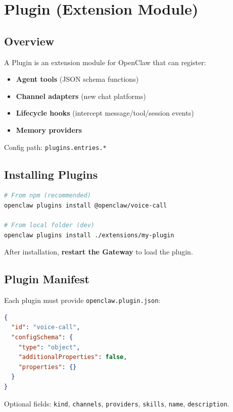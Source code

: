 \chapter{Plugin (Extension Module)}

\section{Overview}

A Plugin is an extension module for OpenClaw that can register:

\begin{itemize}
  \item \textbf{Agent tools} (JSON schema functions)
  \item \textbf{Channel adapters} (new chat platforms)
  \item \textbf{Lifecycle hooks} (intercept message/tool/session events)
  \item \textbf{Memory providers}
\end{itemize}

Config path: \texttt{plugins.entries.*}

\section{Installing Plugins}

\begin{lstlisting}[language=bash]
# From npm (recommended)
openclaw plugins install @openclaw/voice-call

# From local folder (dev)
openclaw plugins install ./extensions/my-plugin
\end{lstlisting}

After installation, \textbf{restart the Gateway} to load the plugin.

\section{Plugin Manifest}

Each plugin must provide \texttt{openclaw.plugin.json}:

\begin{lstlisting}[language=json]
{
  "id": "voice-call",
  "configSchema": {
    "type": "object",
    "additionalProperties": false,
    "properties": {}
  }
}
\end{lstlisting}

Optional fields: \texttt{kind}, \texttt{channels}, \texttt{providers}, \texttt{skills}, \texttt{name}, \texttt{description}.

